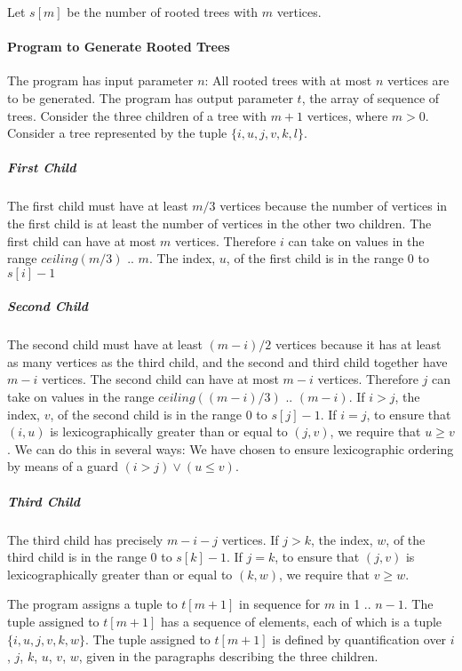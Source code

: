 \vspace{6cm}

Let $s[m]$ be the number of rooted trees with $m$ vertices.

\paragraph{Program to Generate Rooted Trees}
The program has input parameter $n$: All rooted trees with at most $n$
vertices are to be generated.
The program has output parameter $t$, the array of sequence of trees.
Consider the three children of a tree with $m+1$ vertices, where
$m>0$.
Consider a tree represented by the tuple $\{i,u,j,v,k,l\}$.
\subparagraph{First Child}
The first child must have at least $m/3$ vertices because the number of
vertices in the first child is at least the number of vertices in the
other two children.
The first child can have at most $m$ vertices.
Therefore $i$ can take on values in the range $ceiling(m/3)$ .. $m$.
The index, $u$, of the first child is in the range 0  to $s[i]-1$
\subparagraph{Second Child}
The second child must have at least $(m-i)/2$ vertices because it
has at least as many vertices as the third child, and the second and
third child together have $m-i$ vertices.
The second child can have at most $m-i$ vertices.
Therefore $j$ can take on values in the range $ceiling((m-i)/3)$ .. $(m-i)$.
If $i > j$,
the index, $v$, of the second child is in the range 0 to $s[j]-1$.
If $i = j$, to ensure that $(i,u)$ is lexicographically greater than or
equal to $(j,v)$, we require that $u \geq v$.
We can do this in several ways: We have chosen to ensure lexicographic
ordering by means of a guard $(i > j) \vee (u \leq v)$.
\subparagraph{Third Child}
The third child has precisely $m-i-j$ vertices.
If $j > k$,
the index, $w$, of the third child is in the range 0 to $s[k]-1$.
If $j = k$, to ensure that $(j,v)$ is lexicographically greater than or
equal to $(k,w)$, we require that $v \geq w$.


The program assigns a tuple to $t[m+1]$ in sequence for $m$ in 1 .. $n-1$.
The tuple assigned to $t[m+1]$ has a sequence of elements, each of
which is a tuple $\{i,u,j,v,k,w\}$.  
The tuple assigned to $t[m+1]$ is defined by quantification over
$i$, $j$, $k$, $u$, $v$, $w$, given in the paragraphs describing the
three children.


